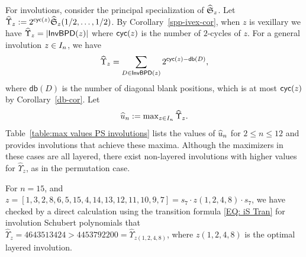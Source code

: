 \documentclass[10pt]{article}
\begin{document}
For involutions, consider the 
principal specialization of $\widehat{\mathfrak S}_z$. Let 
$\widehat{\Upsilon}_z:
=2^{\textsf{cyc}(z)}  \widehat{\mathfrak S}_{z}(1/2,\ldots,1/2)$. By Corollary~\ref{spp-ivex-cor}, when $z$ is vexillary we have $\widehat{\Upsilon}_z=|\mathsf{InvBPD}(z)|$ where $\textsf{cyc}(z)$ is the number of $2$-cycles of $z$. For a general involution $z \in I_n$, we have   
\begin{equation} \label{eq: gen specialization}
\widehat{\Upsilon}_z=\sum_{D \in \mathsf{InvBPD}(z)} 2^{\textsf{cyc}(z) - \mathsf{db}(D)},
\end{equation}
where $\mathsf{db}(D) $  
is the number of diagonal blank positions,
which is at most $\textsf{cyc}(z)$ 
 by Corollary~\ref{db-cor}.
%
%
Let 
\[\textstyle \widehat{u}_n := \max_{z \in I_n}\widehat{\Upsilon}_z.\] 
Table~\ref{table:max values PS involutions} lists the values of $\widehat{u}_n$ 
for $2\leq n \leq 12$ and provides involutions that achieve these maxima.
Although the maximizers in these cases are all layered,
there exist non-layered involutions with higher values for $\widehat{\Upsilon}_z$, as in the permutation case. 







\begin{example} \label{ex: non layered inv that beats layered}
    For $n=15$, and $z=[1, 3, 2, 8, 6, 5, 15, 4, 14, 13, 12, 11, 10, 9, 7]=s_7\cdot  z(1,2,4,8)\cdot s_7$, we have checked  by a direct calculation using the transition formula \eqref{EQ: iS Tran} for  involution Schubert polynomials that $\widehat{\Upsilon}_{z}=4643513424> 4453792200 = \widehat{\Upsilon}_{z(1,2,4,8)}$, where $z(1,2,4,8)$ is the optimal layered involution. 
\end{example}
\end{document}
